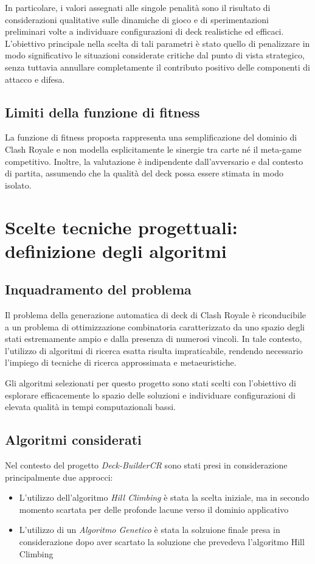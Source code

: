 \documentclass{article}
\begin{document}
In particolare, i valori assegnati alle singole penalità sono il risultato di considerazioni qualitative sulle dinamiche di gioco e di sperimentazioni preliminari volte a individuare configurazioni di deck realistiche ed efficaci. 
L’obiettivo principale nella scelta di tali parametri è stato quello di penalizzare in modo significativo le situazioni considerate critiche dal punto di vista strategico, senza tuttavia annullare completamente il contributo positivo delle componenti di attacco e difesa.

\subsection{Limiti della funzione di fitness}

La funzione di fitness proposta rappresenta una semplificazione del dominio di Clash Royale e non modella esplicitamente le sinergie tra carte né il meta-game competitivo.
Inoltre, la valutazione è indipendente dall’avversario e dal contesto di partita, assumendo che la qualità del deck possa essere stimata in modo isolato.


\section{Scelte tecniche progettuali: definizione degli algoritmi}

\subsection{Inquadramento del problema}

Il problema della generazione automatica di deck di Clash Royale è riconducibile a un problema di ottimizzazione combinatoria caratterizzato da uno spazio degli stati estremamente ampio e dalla presenza di numerosi vincoli.
In tale contesto, l’utilizzo di algoritmi di ricerca esatta risulta impraticabile, rendendo necessario l’impiego di tecniche di ricerca approssimata e metaeuristiche.

Gli algoritmi selezionati per questo progetto sono stati scelti con l’obiettivo di esplorare efficacemente lo spazio delle soluzioni e individuare configurazioni di elevata qualità in tempi computazionali bassi.


\subsection{Algoritmi considerati}

Nel contesto del progetto \textit{Deck-BuilderCR} sono stati presi in considerazione principalmente due approcci:
\begin{itemize}
    \item L'utilizzo dell'algoritmo \textit{Hill Climbing} è stata la scelta iniziale, ma in secondo momento scartata per delle profonde lacune verso il dominio applicativo 
    \item L'utilizzo di un \textit{Algoritmo Genetico} è stata la solzuione finale presa in considerazione dopo aver scartato la soluzione che prevedeva l'algoritmo Hill Climbing 
\end{itemize}
\end{document}
